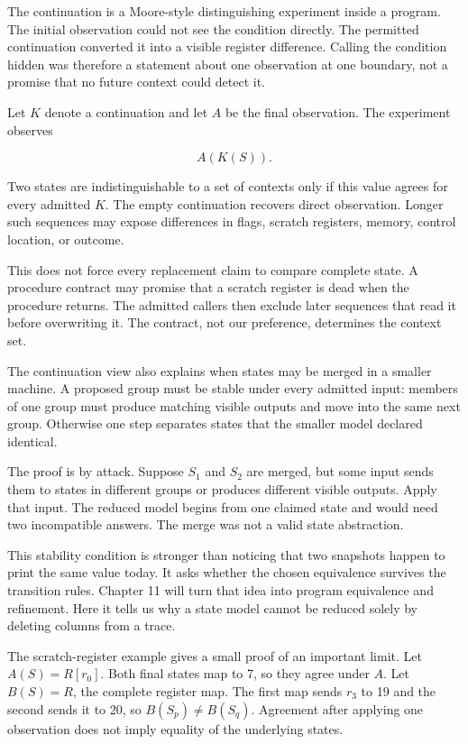 The continuation is a Moore-style distinguishing experiment inside a program. The initial
observation could not see the condition directly. The permitted continuation
converted it into a visible register difference. Calling the condition hidden
was therefore a statement about one observation at one boundary, not a
promise that no future context could detect it.

Let \(K\) denote a continuation and let \(A\) be the final observation. The
experiment observes

\[
A(K(S)).
\]

Two states are indistinguishable to a set of contexts only if this value
agrees for every admitted \(K\). The empty continuation recovers direct
observation. Longer such sequences may expose differences in flags, scratch
registers, memory, control location, or outcome.

This does not force every replacement claim to compare complete state. A
procedure contract may promise that a scratch register is dead when the
procedure returns. The admitted callers then exclude later sequences that read
it before overwriting it. The contract, not our preference, determines the
context set.

The continuation view also explains when states may be merged in a smaller
machine. A proposed group must be stable under every admitted input: members
of one group must produce matching visible outputs and move into the same next
group. Otherwise one step separates states that the smaller model declared
identical.

The proof is by attack. Suppose \(S_1\) and \(S_2\) are merged, but some input
sends them to states in different groups or produces different visible
outputs. Apply that input. The reduced model begins from one claimed state and
would need two incompatible answers. The merge was not a valid state
abstraction.

This stability condition is stronger than noticing that two snapshots happen
to print the same value today. It asks whether the chosen equivalence survives
the transition rules. Chapter 11 will turn that idea into program equivalence
and refinement. Here it tells us why a state model cannot be reduced solely by
deleting columns from a trace.

The scratch-register example gives a small proof of an important limit. Let
\(A(S)=R[r_0]\). Both final states map to 7, so they agree under \(A\). Let
\(B(S)=R\), the complete register map. The first map sends \(r_3\) to 19 and
the second sends it to 20, so \(B(S_p)\ne B(S_q)\). Agreement after applying
one observation does not imply equality of the underlying states.

